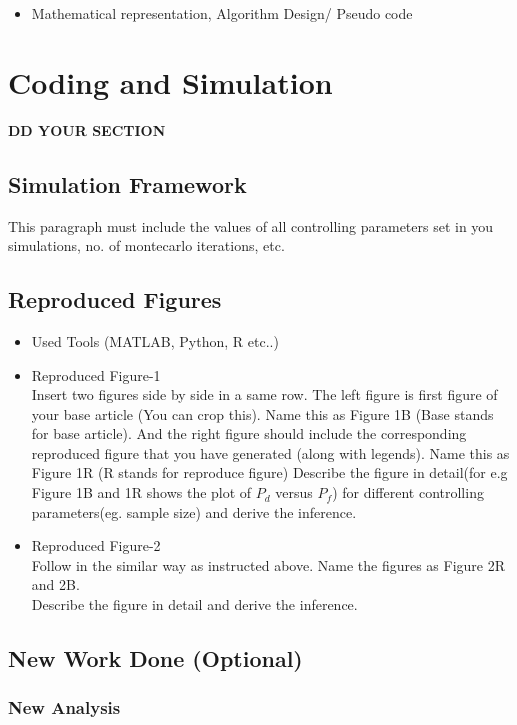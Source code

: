 \documentclass{article}
\begin{document}
\begin{itemize}
    \item Mathematical representation, Algorithm Design/ Pseudo code
\end{itemize}
\section{Coding and Simulation}
\textbf{DD YOUR SECTION }
\subsection{Simulation Framework}
\justify This paragraph must include the values of all controlling parameters set in you simulations, no. of montecarlo iterations, etc.
\subsection{Reproduced Figures}
\begin{itemize}
\item Used Tools (MATLAB, Python, R etc..)
\item Reproduced Figure-1\\
Insert two figures side by side in a same row. The left figure is first figure of your base article (You can crop this). Name this as Figure 1B (Base stands for base article). And the right figure should include the corresponding reproduced figure that you have generated (along with legends). Name this as Figure 1R (R stands for reproduce figure)
Describe the figure in detail(for e.g Figure 1B and 1R shows the plot of $P_d$ versus $P_f$) for different controlling parameters(eg. sample size) and derive the inference.

\item Reproduced Figure-2\\
Follow in the similar way as instructed above. Name the figures as Figure 2R and 2B. \\
Describe the figure in detail and derive the inference.
\end{itemize}

\subsection{New Work Done (Optional)}

\subsubsection{New Analysis}
\end{document}
